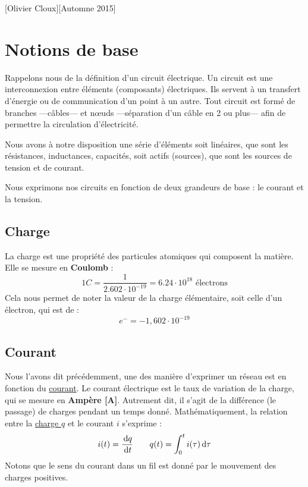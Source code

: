 \documentclass[12pt,a4paper]{article}
\begin{document}
[Olivier Cloux][Automne 2015]
\begin{multicols}{2}
	\tableofcontents
\end{multicols}

\section{Notions de base}
\label{section: notion de base}
Rappelons nous de la définition d'un circuit électrique. Un circuit est une interconnexion entre éléments (composants) électriques. Ils servent à un transfert d'énergie ou de communication d'un point à un autre. Tout circuit est formé de branches ---câbles--- et n\oe uds ---séparation d'un câble en 2 ou plus--- afin de permettre la circulation d'électricité. 

Nous avons à notre disposition une série d'éléments soit linéaires, que sont les résistances, inductances, capacités, soit actifs (sources), que sont les sources de tension et de courant.

Nous exprimons nos circuits en fonction de deux grandeurs de base : le courant et la tension.

\subsection{Charge}
\label{subsection: base charge}
La charge est une propriété des particules atomiques qui composent la matière. Elle se mesure en \textbf{Coulomb} :
\begin{equation}
	1C = \frac{1}{2.602\cdot10^{-19}} = 6.24\cdot 10^{18} \text{ électrons}
	\label{equ: definition charge}
\end{equation}
Cela nous permet de noter la valeur de la charge élémentaire, soit celle d'un électron, qui est de :
\[e^{-} = -1,602 \cdot 10^{-19}\]

\subsection{Courant}
\label{subsection: base courant}
Nous l'avons dit précédemment, une des manière d'exprimer un réseau est en fonction du \uline{courant}. Le courant électrique est le taux de variation de la charge, qui se mesure en \textbf{Ampère [A]}. Autrement dit, il s'agit de la différence (le passage) de charges pendant un temps donné. Mathématiquement, la relation entre la \uline{charge $q$} et le courant $i$ s'exprime :
\begin{equation}
	i(t) = \frac{\, \mathrm d q}{\, \mathrm d t} \qquad q(t) = \int_0^t i(\tau) \, \mathrm d \tau
	\label{equ: relation charge courant}
\end{equation}
Notons que le sens du courant dans un fil est donné par le mouvement des charges positives. 
\end{document}
